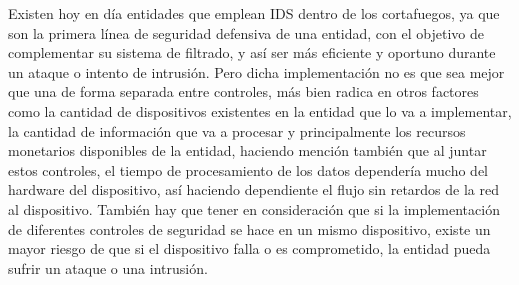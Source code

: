 Existen hoy en día entidades que emplean IDS dentro de los cortafuegos, ya que son la primera línea de seguridad defensiva de una entidad, con el objetivo de complementar su sistema de filtrado, y así ser más eficiente y oportuno durante un ataque o intento de intrusión. Pero dicha implementación no es que sea mejor que una de forma separada entre controles, más bien radica en otros factores como la cantidad de dispositivos existentes en la entidad que lo va a implementar, la cantidad de información que va a procesar y principalmente los recursos monetarios disponibles de la entidad, haciendo mención también que al juntar estos controles, el tiempo de procesamiento de los datos dependería mucho del hardware del dispositivo, así haciendo dependiente el flujo sin retardos de la red al dispositivo. También hay que tener en consideración que si la implementación de diferentes controles de seguridad se hace en un mismo dispositivo, existe un mayor riesgo de que si el dispositivo falla o es comprometido, la entidad pueda sufrir un ataque o una intrusión. \\

